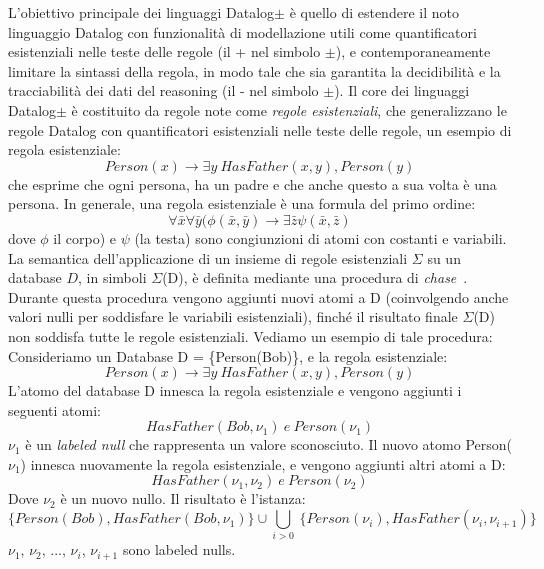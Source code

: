 L'obiettivo principale dei linguaggi Datalog$\pm$ è quello di estendere il noto linguaggio Datalog con funzionalità di modellazione utili come quantificatori esistenziali nelle teste delle regole (il + nel simbolo $\pm $), e contemporaneamente limitare la sintassi della regola, in modo tale che sia garantita la decidibilità e la tracciabilità dei dati del reasoning (il - nel simbolo $\pm $). \newline
Il core dei linguaggi Datalog$\pm $ è costituito da regole note come \emph{regole esistenziali}, che generalizzano le regole Datalog con quantificatori esistenziali nelle teste delle regole, un esempio di regola esistenziale: \[Person(x) \rightarrow \exists y ~HasFather(x,y), Person(y)\]
che esprime che ogni persona, ha un padre e che anche questo a sua volta è una persona. \newline
In generale, una regola esistenziale è una formula del primo ordine: \[\forall \bar{x} \forall \bar{y} (\phi(\bar{x}, \bar{y}) \rightarrow \exists \bar{z} \psi (\bar{x}, \bar{z})\]
dove $\phi$ il corpo) e $\psi$  (la testa) sono congiunzioni di atomi con costanti e variabili. \newline
La semantica dell'applicazione di un insieme di regole esistenziali $\Sigma$ su un database $D$, in simboli $\Sigma$(D), è definita mediante una procedura di \emph{chase}~\cite{fagin2005data}. Durante questa procedura vengono aggiunti nuovi atomi a D (coinvolgendo anche valori nulli per soddisfare le variabili esistenziali), finché il risultato finale $\Sigma$(D) non soddisfa tutte le regole esistenziali. \newline
Vediamo un esempio di tale procedura: \newline
Consideriamo un Database D = \{Person(Bob)\}, e la regola esistenziale: \[Person(x) \rightarrow \exists y ~HasFather(x,y), Person(y)\]
L'atomo del database D innesca la regola esistenziale e vengono aggiunti i seguenti atomi: \[HasFather(Bob, \nu_{1}) ~e~ Person(\nu_{1})\]
$\nu_{1}$ è un \emph{labeled null} che rappresenta un valore sconosciuto.\newline
Il nuovo atomo Person($\nu_{1}$) innesca nuovamente la regola esistenziale, e vengono aggiunti altri atomi a D: \[HasFather(\nu_{1}, \nu_{2}) ~e~ Person(\nu_{2})\]
Dove $\nu_{2}$ è un nuovo nullo. Il risultato è l'istanza: \[\{Person(Bob), HasFather(Bob, \nu_{1})\} \cup \underset{i>0}{\bigcup} ~\{Person(\nu_{i}), HasFather(\nu_{i}, \nu_{i+1})\}\]
$\nu_{1}$, $\nu_{2}$, ..., $\nu_{i}$, $\nu_{i+1}$ sono labeled nulls. \newline \newline
